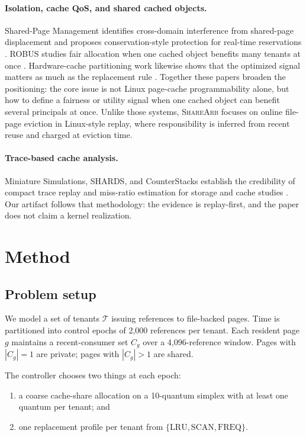 \documentclass{article}
\newcommand{\sharearb}{\textsc{ShareArb}\xspace}
\begin{document}
\paragraph{Isolation, cache QoS, and shared cached objects.}
Shared-Page Management identifies cross-domain interference from shared-page displacement and proposes conservation-style protection for real-time reservations \citep{kim2012sharedpage}. ROBUS studies fair allocation when one cached object benefits many tenants at once \citep{kunjir2017robus}. Hardware-cache partitioning work likewise shows that the optimized signal matters as much as the replacement rule \citep{qureshi2006ucp,kim2004faircache}. Together these papers broaden the positioning: the core issue is not Linux page-cache programmability alone, but how to define a fairness or utility signal when one cached object can benefit several principals at once. Unlike those systems, \sharearb focuses on online file-page eviction in Linux-style replay, where responsibility is inferred from recent reuse and charged at eviction time.

\paragraph{Trace-based cache analysis.}
Miniature Simulations, SHARDS, and CounterStacks establish the credibility of compact trace replay and miss-ratio estimation for storage and cache studies \citep{waldspurger2017miniaturesim,waldspurger2015shards,tian2015counterstacks}. Our artifact follows that methodology: the evidence is replay-first, and the paper does not claim a kernel realization.

\section{Method}
\label{sec:method}

\subsection{Problem setup}

We model a set of tenants $\mathcal{T}$ issuing references to file-backed pages. Time is partitioned into control epochs of 2{,}000 references per tenant. Each resident page $g$ maintains a recent-consumer set $C_g$ over a 4{,}096-reference window. Pages with $|C_g|=1$ are private; pages with $|C_g|>1$ are shared.

The controller chooses two things at each epoch:
\begin{enumerate}[leftmargin=1.5em]
  \item a coarse cache-share allocation on a 10-quantum simplex with at least one quantum per tenant; and
  \item one replacement profile per tenant from $\{\mathrm{LRU}, \mathrm{SCAN}, \mathrm{FREQ}\}$.
\end{enumerate}
\end{document}
